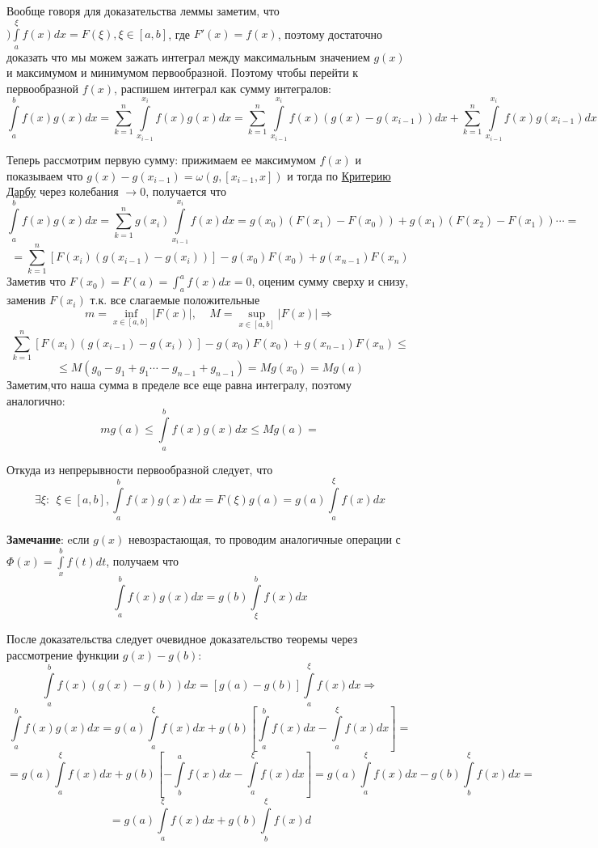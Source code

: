 \documentclass[a4paper,11pt]{article}
\newcommand{\Sum}{\sum\limits_{k = 1}^n}
\begin{document}
{
	
Вообще говоря для доказательства леммы заметим, что $)\int\limits_a^{\xi}f(x)dx = F(\xi), \xi \in [a, b]$, где $F'(x) = f(x)$, поэтому достаточно доказать что мы  можем зажать интеграл между максимальным значением $g(x)$ и максимумом и минимумом первообразной. Поэтому чтобы перейти к первообразной $f(x)$, распишем интеграл как сумму интегралов:
\[
\int\limits_a^b f(x)g(x)dx = \Sum \int\limits_{x_{i-1}}^{x_i} f(x)g(x)dx = \Sum \int\limits_{x_{i-1}}^{x_i} f(x)(g(x) -g(x_{i-1}))dx + \Sum \int\limits_{x_{i-1}}^{x_i} f(x)g(x_{i-1})dx
\]

Теперь рассмотрим первую сумму: прижимаем ее максимумом $f(x)$ и показываем что $g(x) - g(x_{i-1}) = \omega(g, [x_{i-1}, x])$ и тогда по \hyperref[Th:kdarbu]{Критерию Дарбу} через колебания $\to 0$, получается что
\[
\int\limits_a^b f(x)g(x)dx = \Sum g(x_i) \int\limits_{x_{i-1}}^{x_i} f(x)dx = g(x_0) (F(x_1) - F(x_{0})) + g(x_1)(F(x_2) - F(x_1)) \cdots =
\]
\[
= \Sum [ F(x_i)(g(x_{i-1}) - g(x_{i}))] -g(x_0) F(x_0) + g(x_{n-1})F(x_n)
\]
Заметив что $F(x_0) = F(a) = \int_a^a f(x)dx = 0$, оценим сумму сверху и снизу, заменив $F(x_i)$ т.к. все слагаемые положительные 
\[
m = \inf\limits_{x \in [a, b]} |F(x)|, \ \ \ \ \  M = \sup\limits_{x \in [a, b]} |F(x)| \Rightarrow
\]
\[
 \Sum [ F(x_i)(g(x_{i-1}) - g(x_{i}))] -g(x_0) F(x_0) + g(x_{n-1})F(x_n) \leq 
\]
\[
\leq M(g_0 -g_1 +g_1 \cdots - g_{n-1} + g_{n-1}) = Mg(x_0) = Mg(a)
\]
Заметим,что наша сумма  в пределе все еще равна интегралу, поэтому аналогично:
\[
mg(a) \leq \int\limits_a^b f(x)g(x)dx \leq Mg(a) = 
\]

Откуда из непрерывности первообразной следует, что
\[
\exists \xi:  \ \ \xi \in [a, b],  \int\limits_a^b f(x)g(x)dx = F(\xi)g(a) = g(a) \int\limits_a^{\xi} f(x)dx
\]

\textbf{Замечание}: 
eсли $g(x)$ невозрастающая, то проводим аналогичные операции с $\Phi(x) = \int\limits_x^b f(t)dt$, получаем что
\[
\int\limits_a^b f(x)g(x)dx = g(b)\int\limits_{\xi}^b f(x)dx
\]

После доказательства следует очевидное доказательство теоремы через рассмотрение функции $g(x) - g(b)$:
\[
\int\limits_a^b f(x)(g(x) - g(b))dx = [g(a) - g(b)]\int\limits_a^{\xi} f(x)dx \Rightarrow 
\]
\[
\int\limits_a^b f(x)g(x)dx = g(a)\int\limits_{a}^{\xi} f(x)dx + g(b)\left[\int\limits_a^b f(x)dx - \int\limits_a^{\xi} f(x)dx \right] = 
\]
\[
 =g(a)\int\limits_{a}^{\xi} f(x)dx + g(b)\left[-\int\limits_b^a f(x)dx - \int\limits_a^{\xi} f(x)dx \right] =   g(a)\int\limits_{a}^{\xi} f(x)dx - g(b) \int\limits_b^{\xi} f(x)dx  = 
\]
\[
= g(a)\int\limits_{a}^{\xi} f(x)dx + g(b) \int\limits_b^{\xi} f(x)d
\]
}
\end{document}
